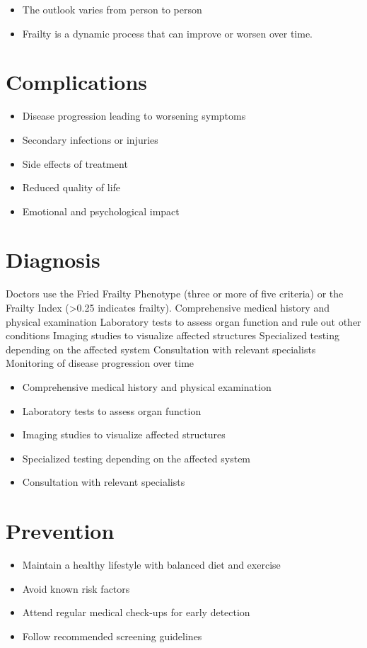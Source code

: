 \begin{itemize}[noitemsep]
  \item The outlook varies from person to person
  \item Frailty is a dynamic process that can improve or worsen over time.
\end{itemize}
\section{Complications}
\begin{itemize}[noitemsep]
  \item Disease progression leading to worsening symptoms
  \item Secondary infections or injuries
  \item Side effects of treatment
  \item Reduced quality of life
  \item Emotional and psychological impact
\end{itemize}
\section{Diagnosis}
Doctors use the Fried Frailty Phenotype (three or more of five criteria) or the Frailty Index (>0.25 indicates frailty). Comprehensive medical history and physical examination Laboratory tests to assess organ function and rule out other conditions Imaging studies to visualize affected structures Specialized testing depending on the affected system Consultation with relevant specialists Monitoring of disease progression over time

\begin{itemize}[noitemsep]
  \item Comprehensive medical history and physical examination
  \item Laboratory tests to assess organ function
  \item Imaging studies to visualize affected structures
  \item Specialized testing depending on the affected system
  \item Consultation with relevant specialists
\end{itemize}
\section{Prevention}
\begin{itemize}[noitemsep]
  \item Maintain a healthy lifestyle with balanced diet and exercise
  \item Avoid known risk factors
  \item Attend regular medical check-ups for early detection
  \item Follow recommended screening guidelines
\end{itemize}

